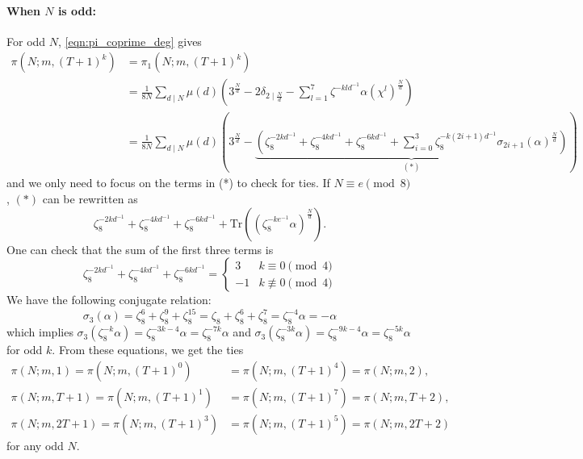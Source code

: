 \documentclass[10pt,reqno]{amsproc}
\newcommand{\Tr}{\mathrm{Tr}}
\newcommand{\1}{\mathds{1}}	%
\theoremstyle{definition}
\theoremstyle{remark}
\begin{document}
\paragraph{\textbf{When $N$ is odd:}}
For odd $N$, \eqref{eqn:pi_coprime_deg} gives
\begin{align*}
\pi(N; m, (T + 1)^k) &= \pi_1(N; m, (T+1)^k)\\
&= \frac{1}{8N} \sum_{d \mid N} \mu(d) \left(3^{\frac{N}{d}} - 2 \delta_{2 \mid \frac{N}{d}} - \sum_{l=1}^{7} \zeta^{-kld^{-1}} \alpha(\chi^l)^{\frac{N}{d}}\right) \\
&=\frac{1}{8N} \sum_{d \mid N} \mu(d) \left(3^{\frac{N}{d}} - \underbrace{\left( \zeta_8^{-2kd^{-1}} + \zeta_8^{-4kd^{-1}} + \zeta_8^{-6kd^{-1}}+ \sum_{i=0}^{3} \zeta_8^{-k(2i+1)d^{-1}} \sigma_{2i+1}(\alpha)^{\frac{N}{d}}\right)}_{(*)} \right)
\end{align*}
and we only need to focus on the terms in (*) to check for ties.
If $N \equiv e \pmod 8$, $(*)$ can be rewritten as
\[
\zeta_8^{-2kd^{-1}} + \zeta_8^{-4kd^{-1}} + \zeta_8^{-6kd^{-1}} + \Tr((\zeta_8^{-ke^{-1}} \alpha)^{\frac{N}{d}}).
\]
One can check that the sum of the first three terms is
\begin{equation}
    \label{eqn:p3T21_sum1}
    \zeta_8^{-2kd^{-1}} + \zeta_8^{-4kd^{-1}} + \zeta_8^{-6kd^{-1}} = \begin{cases} 3 & k \equiv 0 \pmod{4} \\ -1 & k \not\equiv 0 \pmod{4} \end{cases}
\end{equation}
We have the following conjugate relation:
\[
\sigma_3(\alpha) = \zeta_8^6 + \zeta_8^9 + \zeta_8^{15} = \zeta_8 + \zeta_8^6 + \zeta_8^7 = \zeta_8^{-4} \alpha = -\alpha
\]
which implies $\sigma_3(\zeta_8^{-k}\alpha) = \zeta_8^{-3k-4}\alpha = \zeta_8^{-7k}\alpha$ and $\sigma_3(\zeta_8^{-3k}\alpha) = \zeta_8^{-9k-4}\alpha = \zeta_8^{-5k}\alpha$ for odd $k$.
From these equations, we get the ties
\begin{align*}
    \pi(N; m, 1) =\pi(N; m, (T+1)^0) &= \pi (N; m, (T+1)^4) = \pi(N; m, 2), \\
    \pi(N; m, T + 1) = \pi(N; m, (T+1)^1) &= \pi(N; m, (T+1)^7) = \pi(N; m, T + 2),\\
    \pi(N; m, 2T+1) = \pi(N; m, (T+1)^3) &= \pi(N; m, (T+1)^5) = \pi(N; m, 2T+2)
\end{align*}
for any odd $N$.
\end{document}
